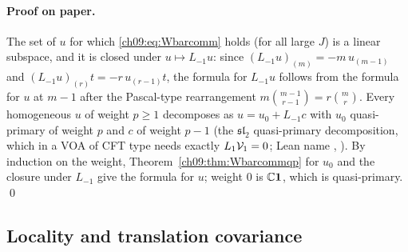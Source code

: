 \paragraph{Proof on paper.} The set of $u$ for which \eqref{ch09:eq:Wbarcomm} holds (for all large
$J$) is a linear subspace, and it is closed under $u\mapsto L_{-1}u$: since
$(L_{-1}u)_{(m)}=-m\,u_{(m-1)}$ and $(L_{-1}u)_{(r)}t=-r\,u_{(r-1)}t$, the formula for $L_{-1}u$ follows
from the formula for $u$ at $m-1$ after the Pascal-type rearrangement
$m\binom{m-1}{r-1}=r\binom mr$. Every homogeneous $u$ of weight $p\ge1$ decomposes as
$u=u_0+L_{-1}c$ with $u_0$ quasi-primary of weight $p$ and $c$ of weight $p-1$ (the
$\mathfrak{sl}_2$ quasi-primary decomposition, which in a VOA of CFT type needs exactly
$L_1\mathcal{V}_1=0$; Lean name , ). By
induction on the weight, Theorem~\ref{ch09:thm:Wbarcommqp} for $u_0$ and the closure under $L_{-1}$
give the formula for $u$; weight $0$ is ${\mathbb{C}}\mathbf1$, which is quasi-primary. \qed

\subsection{Locality and translation covariance}

